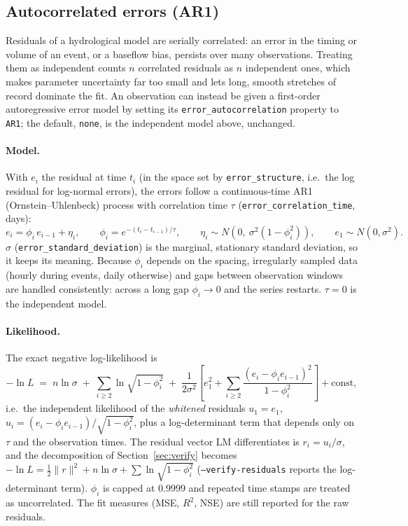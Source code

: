 \documentclass[11pt,a4paper]{article}
\newcommand{\code}[1]{\texttt{\small #1}}
\begin{document}
\subsection{Autocorrelated errors (AR1)}\label{sec:ar1}

Residuals of a hydrological model are serially correlated: an error in the
timing or volume of an event, or a baseflow bias, persists over many
observations. Treating them as independent counts $n$ correlated residuals as
$n$ independent ones, which makes parameter uncertainty far too small and lets
long, smooth stretches of record dominate the fit. An observation can instead be
given a first-order autoregressive error model by setting its
\code{error\_autocorrelation} property to \code{AR1}; the default, \code{none},
is the independent model above, unchanged.

\paragraph{Model.} With $e_i$ the residual at time $t_i$ (in the space set by
\code{error\_structure}, i.e.\ the log residual for log-normal errors), the
errors follow a continuous-time AR1 (Ornstein--Uhlenbeck) process with
correlation time $\tau$ (\code{error\_correlation\_time}, days):
\begin{equation}
  e_i = \phi_i\, e_{i-1} + \eta_i,\qquad
  \phi_i = e^{-(t_i - t_{i-1})/\tau},\qquad
  \eta_i \sim N\!\left(0,\ \sigma^2(1-\phi_i^2)\right),\qquad
  e_1 \sim N(0,\sigma^2).
\end{equation}
$\sigma$ (\code{error\_standard\_deviation}) is the marginal, stationary standard
deviation, so it keeps its meaning. Because $\phi_i$ depends on the spacing,
irregularly sampled data (hourly during events, daily otherwise) and gaps
between observation windows are handled consistently: across a long gap
$\phi_i\to 0$ and the series restarts. $\tau = 0$ is the independent model.

\paragraph{Likelihood.} The exact negative log-likelihood is
\begin{equation}
  -\ln L \;=\; n\ln\sigma \;+\; \sum_{i\ge 2}\ln\sqrt{1-\phi_i^2}
  \;+\; \frac{1}{2\sigma^2}\left[e_1^2 + \sum_{i\ge 2}
  \frac{(e_i-\phi_i e_{i-1})^2}{1-\phi_i^2}\right] + \text{const},
\end{equation}
i.e.\ the independent likelihood of the \emph{whitened} residuals
$u_1=e_1$, $u_i=(e_i-\phi_i e_{i-1})/\sqrt{1-\phi_i^2}$, plus a log-determinant
term that depends only on $\tau$ and the observation times. The residual vector
LM differentiates is $r_i = u_i/\sigma$, and the decomposition of
Section~\ref{sec:verify} becomes $-\ln L = \tfrac12\|r\|^2 + n\ln\sigma + \sum\ln\sqrt{1-\phi_i^2}$
(\code{--verify-residuals} reports the log-determinant term). $\phi_i$ is capped
at 0.9999 and repeated time stamps are treated as uncorrelated. The fit measures
(MSE, $R^2$, NSE) are still reported for the raw residuals.
\end{document}

